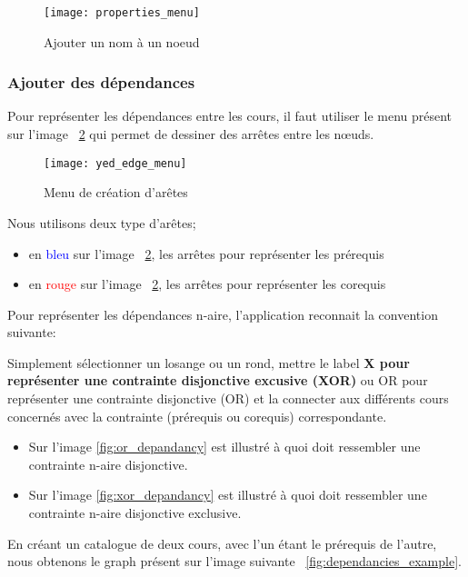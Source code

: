 \begin{figure}
\centering
\caption{Ajouter un nom à un noeud}
\label{fig:properties_menu}
\texttt{[image: properties\_menu]}
\end{figure}


\subsubsection{Ajouter des dépendances}

Pour représenter les dépendances entre les cours, il faut utiliser le menu présent sur l'image  ~\ref{fig:yed_edge_menu} qui permet de dessiner des arrêtes entre les nœuds.

\begin{figure}
\centering
\caption{Menu de création d’arêtes}
\label{fig:yed_edge_menu}
\texttt{[image: yed\_edge\_menu]}
\end{figure}

Nous utilisons deux type d’arêtes;

\begin{itemize}
\item en \textcolor{blue}{bleu} sur l'image ~\ref{fig:yed_edge_menu}, les arrêtes pour représenter les prérequis
\item en \textcolor{red}{rouge} sur l'image ~\ref{fig:yed_edge_menu}, les arrêtes pour représenter les corequis
\end{itemize}

Pour représenter les dépendances n-aire, l'application reconnait la convention suivante:

Simplement sélectionner un losange ou un rond, mettre le label \textbf{X pour représenter une contrainte disjonctive excusive (XOR)} ou {OR pour représenter une contrainte disjonctive (OR)} et la connecter aux différents cours concernés avec la contrainte (prérequis ou corequis) correspondante.

\begin{itemize}
\item Sur l'image \ref{fig:or_depandancy} est illustré à quoi doit ressembler une contrainte n-aire disjonctive.
\item Sur l'image \ref{fig:xor_depandancy} est illustré à quoi doit ressembler une contrainte n-aire disjonctive exclusive.
\end{itemize}

En créant un catalogue de deux cours, avec l'un étant le prérequis de l'autre, nous obtenons le graph présent sur l'image suivante ~\ref{fig:dependancies_example}.

